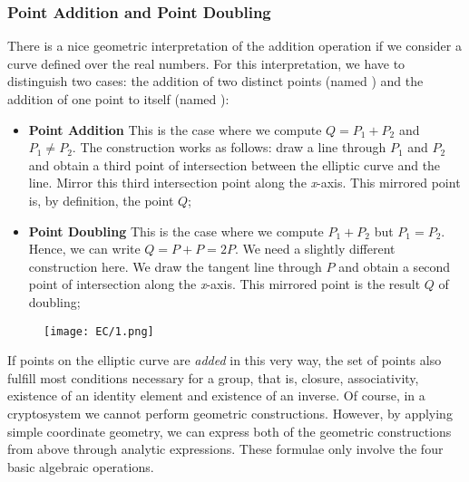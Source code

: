 \subsubsection{Point Addition and Point Doubling}
There is a nice geometric interpretation of the addition operation if we consider a curve defined over the real numbers. For this interpretation, we have to distinguish two cases: the addition of two distinct points (named ) and the addition of one point to itself (named ):
\begin{itemize}
    \item \textbf{Point Addition} This is the case where we compute $Q=P_1+P_2$ and $P_1\not=P_2$. The construction works as follows: draw a line through $P_1$ and $P_2$ and obtain a third point of intersection between the elliptic curve and the line. Mirror this third intersection point along the \textit{x}-axis. This mirrored point is, by definition, the point $Q$;
    \item \textbf{Point Doubling} This is the case where we compute $P_1+P_2$ but $P_1=P_2$. Hence, we can write $Q=P+P=2P$. We need a slightly different construction here. We draw the tangent line through $P$ and obtain a second point of intersection along the \textit{x}-axis. This mirrored point is the result $Q$ of doubling;
\end{itemize}
\begin{figure}[H]
    \centering
    \texttt{[image: EC/1.png]}
\end{figure}
If points on the elliptic curve are \textit{added} in this very way, the set of points also fulfill most conditions necessary for a group, that is, closure, associativity, existence of an identity element and existence of an inverse. Of course, in a cryptosystem we cannot perform geometric constructions. However, by applying simple coordinate geometry, we can express both of the geometric constructions from above through analytic expressions. These formulae only involve the four basic algebraic operations.

